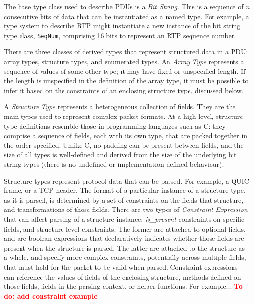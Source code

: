 \documentclass[10pt,sigconf]{acmart}
\newcommand{\todo}[1]{\textbf{\textcolor{red}{To do: #1}}}
\begin{document}
The base type class used to describe PDUs is a \emph{Bit String}.
This is a sequence of $n$ consecutive bits of data that can be instantiated
as a named type.
For example, a type system to describe RTP \cite{RFC3550} might instantiate
a new instance of the bit string type class, \texttt{SeqNum}, comprising 16
bits to represent an RTP sequence number.

There are three classes of derived types that represent structured data in
a PDU: array types, structure types, and enumerated types.
An \emph{Array Type} represents a sequence of values of some other type; 
it may have fixed or unspecified length. If the length is unspecified in
the definition of the array type, it must be possible to infer it based
on the constraints of an enclosing structure type, discussed below.

A \emph{Structure Type} represents a heterogeneous collection of fields.
They are the main types used to represent complex packet formats.
At a high-level, structure type definitions resemble those in programming
languages such as C: they comprise a sequence of fields, each with its own
type, that are packed together in the order specified. Unlike C, no padding
can be present between fields, and the size of all types is well-defined
and derived from the size of the underlying bit string types (there is no
undefined or implementation defined behaviour).

Structure types represent protocol data that can be parsed.
For example, a QUIC frame, or a TCP header.
The format of a particular instance of a structure type, as it is parsed,
is determined by a set of constraints on the fields that structure, and
transformations of those fields. 
There are two types of \emph{Constraint Expression} that can affect parsing
of a structure instance: \emph{is\_present} constraints on specific fields,
and structure-level constraints.
The former are attached to optional fields, and are boolean expressions
that declaratively indicates whether those fields are present when the
structure is parsed.
The latter are attached to the structure as a whole, and specify more
complex constraints, potentially across multiple fields, that must hold
for the packet to be valid when parsed. 
Constraint expressions can reference the values of fields of the enclosing
structure, methods defined on those fields, fields in the parsing context,
or helper functions. 
For example... \todo{add constraint example}
\end{document}
